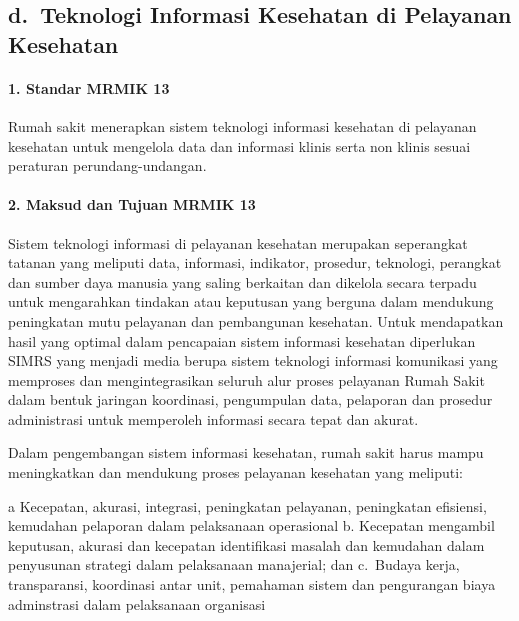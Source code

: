 \documentclass[
]{book}
\begin{document}
\hypertarget{d.-teknologi-informasi-kesehatan-di-pelayanan-kesehatan}{%
\subsection*{d.~Teknologi Informasi Kesehatan di Pelayanan Kesehatan}\label{d.-teknologi-informasi-kesehatan-di-pelayanan-kesehatan}}

\hypertarget{standar-mrmik-13}{%
\paragraph*{1. Standar MRMIK 13}\label{standar-mrmik-13}}

Rumah sakit menerapkan sistem teknologi informasi kesehatan di pelayanan kesehatan untuk mengelola data dan informasi klinis serta non klinis sesuai peraturan perundang-undangan.

\hypertarget{maksud-dan-tujuan-mrmik-13}{%
\paragraph*{2. Maksud dan Tujuan MRMIK 13}\label{maksud-dan-tujuan-mrmik-13}}

Sistem teknologi informasi di pelayanan kesehatan merupakan seperangkat tatanan yang meliputi data, informasi, indikator, prosedur, teknologi, perangkat dan sumber daya manusia yang saling berkaitan dan dikelola secara terpadu untuk mengarahkan tindakan atau keputusan yang berguna dalam mendukung peningkatan mutu pelayanan dan pembangunan kesehatan. Untuk mendapatkan hasil yang optimal dalam pencapaian sistem informasi kesehatan diperlukan SIMRS yang menjadi media berupa sistem teknologi informasi komunikasi yang memproses dan mengintegrasikan seluruh alur proses pelayanan Rumah Sakit dalam bentuk jaringan koordinasi, pengumpulan data, pelaporan dan prosedur administrasi untuk memperoleh informasi secara tepat dan akurat.

Dalam pengembangan sistem informasi kesehatan, rumah sakit harus mampu meningkatkan dan mendukung proses pelayanan kesehatan yang meliputi:

a Kecepatan, akurasi, integrasi, peningkatan pelayanan, peningkatan efisiensi, kemudahan pelaporan dalam pelaksanaan operasional
b. Kecepatan mengambil keputusan, akurasi dan kecepatan identifikasi masalah dan kemudahan dalam penyusunan strategi dalam pelaksanaan manajerial; dan
c.~Budaya kerja, transparansi, koordinasi antar unit, pemahaman sistem dan pengurangan biaya adminstrasi dalam pelaksanaan organisasi
\end{document}

